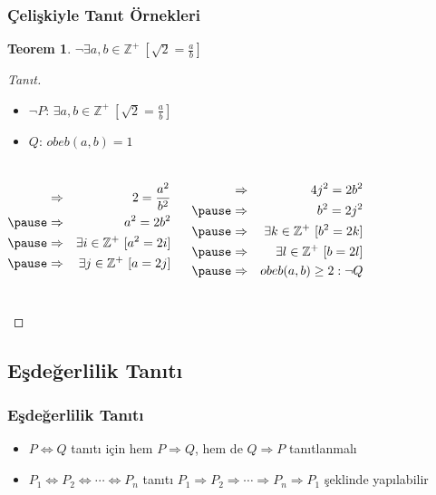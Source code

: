 \documentclass[dvipsnames]{beamer}
\theoremstyle{definition}
\theoremstyle{example}
\theoremstyle{plain}
\newtheorem{teorem}[theorem]{Teorem}
\begin{document}
\begin{frame}
  \frametitle{Çelişkiyle Tanıt Örnekleri}

  \begin{teorem}
    $\neg \exists a,b \in \mathbb{Z}^+~[\sqrt{2}=\frac{a}{b}]$
  \end{teorem}

  \pause
  \begin{proof}[Tanıt]
    \begin{itemize}
      \item $\neg P$: $\exists a,b \in \mathbb{Z}^+~[\sqrt{2}=\frac{a}{b}]$
      \item $Q$: $obeb(a,b)=1$
    \end{itemize}

    \pause
    \vspace{-0.7cm}
    \begin{columns}[t]
      \begin{eqnarray*}
        & \Rightarrow & 2 = \frac{a^2}{b^2}\\\pause
        & \Rightarrow & a^2 = 2b^2\\\pause
        & \Rightarrow & \exists i \in \mathbb{Z}^+~[a^2=2i]\\\pause
        & \Rightarrow & \exists j \in \mathbb{Z}^+~[a=2j]
      \end{eqnarray*}

      \pause
      \begin{eqnarray*}
        & \Rightarrow & 4j^2 = 2b^2\\\pause
        & \Rightarrow & b^2 = 2j^2\\\pause
        & \Rightarrow & \exists k \in \mathbb{Z}^+~[b^2=2k]\\\pause
        & \Rightarrow & \exists l \in \mathbb{Z}^+~[b=2l]\\\pause
        & \Rightarrow & obeb(a,b) \geq 2: \neg Q
      \end{eqnarray*}
    \end{columns}
  \end{proof}
\end{frame}

\subsection{Eşdeğerlilik Tanıtı}

\begin{frame}
  \frametitle{Eşdeğerlilik Tanıtı}

  \begin{itemize}
    \item $P \Leftrightarrow Q$ tanıtı için hem $P \Rightarrow Q$, hem de
      $Q \Rightarrow P$ tanıtlanmalı

    \pause
    \medskip
    \item $P_1 \Leftrightarrow P_2 \Leftrightarrow \cdots \Leftrightarrow P_n$
      tanıtı $P_1 \Rightarrow P_2 \Rightarrow \cdots \Rightarrow P_n
      \Rightarrow P_1$ şeklinde yapılabilir
  \end{itemize}
\end{frame}
\end{document}
